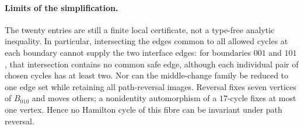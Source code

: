 \paragraph{Limits of the simplification.}
The twenty entries are still a finite local certificate, not a
type-free analytic inequality. In particular, intersecting the
edges common to all allowed cycles at each boundary cannot supply
the two interface edges: for boundaries $001$ and $101$, that
intersection contains no common safe edge, although each individual
pair of chosen cycles has at least two.
Nor can the middle-change family be reduced to one edge set while
retaining all path-reversal images. Reversal fixes seven vertices
of $B_{010}$ and moves others; a nonidentity automorphism of a
$17$-cycle fixes at most one vertex. Hence no Hamilton cycle of this
fibre can be invariant under path reversal.
